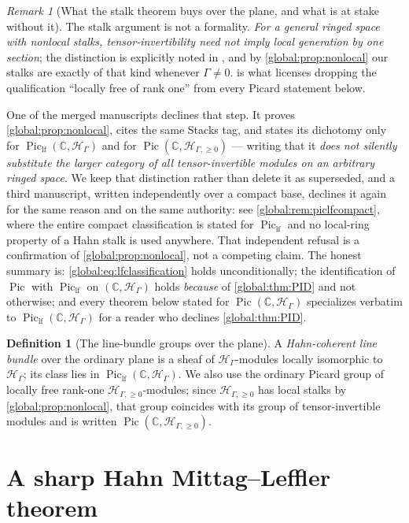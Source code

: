 \documentclass[11pt,letterpaper]{article}
\theoremstyle{definition}
\newtheorem{definition}[definition]{Definition}
\theoremstyle{remark}
\newtheorem{remark}[remark]{Remark}
\newcommand{\C}{\mathbb C}
\newcommand{\HH}{\mathscr H_\Gamma}
\newcommand{\HI}{\mathscr H_{\Gamma,\ge0}}
\newcommand{\Pic}{\operatorname{Pic}}
\newcommand{\Piclf}{\operatorname{Pic}_{\mathrm{lf}}}
\numberwithin{equation}{section}
\begin{document}
\begin{remark}[What the stalk theorem buys over the plane, and what is at stake without it]\label{global:rem:piclf}
The stalk argument is not a formality. \emph{For a general ringed space with nonlocal stalks, tensor-invertibility need not imply local generation by one section}; the distinction is explicitly noted in \cite[Tag~09NT]{Stacks}, and by \cref{global:prop:nonlocal} our stalks are exactly of that kind whenever $\Gamma\ne0$.  is what licenses dropping the qualification ``locally free of rank one'' from every Picard statement below.

One of the merged manuscripts declines that step. It proves \cref{global:prop:nonlocal}, cites the same Stacks tag, and states its dichotomy only for $\Piclf(\C,\HH)$ and for $\Pic(\C,\HI)$ --- writing that it \emph{does not silently substitute the larger category of all tensor-invertible modules on an arbitrary ringed space}. We keep that distinction rather than delete it as superseded, and a third manuscript, written independently over a compact base, declines it again for the same reason and on the same authority: see \cref{global:rem:piclfcompact}, where the entire compact classification is stated for $\Piclf$ and no local-ring property of a Hahn stalk is used anywhere. That independent refusal is a confirmation of \cref{global:prop:nonlocal}, not a competing claim. The honest summary is: \eqref{global:eq:lfclassification} holds unconditionally; the identification of $\Pic$ with $\Piclf$ on $(\C,\HH)$ holds \emph{because} of \cref{global:thm:PID} and not otherwise; and every theorem below stated for $\Pic(\C,\HH)$ specializes verbatim to $\Piclf(\C,\HH)$ for a reader who declines \cref{global:thm:PID}.
\end{remark}

\begin{definition}[The line-bundle groups over the plane]\label{global:def:bundles}
A \emph{Hahn-coherent line bundle} over the ordinary plane is a sheaf of $\HH$-modules locally isomorphic to $\HH$; its class lies in $\Piclf(\C,\HH)$. We also use the ordinary Picard group of locally free rank-one $\HI$-modules; since $\HI$ has local stalks by \cref{global:prop:nonlocal}, that group coincides with its group of tensor-invertible modules and is written $\Pic(\C,\HI)$.
\end{definition}

\section{A sharp Hahn Mittag--Leffler theorem}\label{global:sec:ML}
\end{document}
